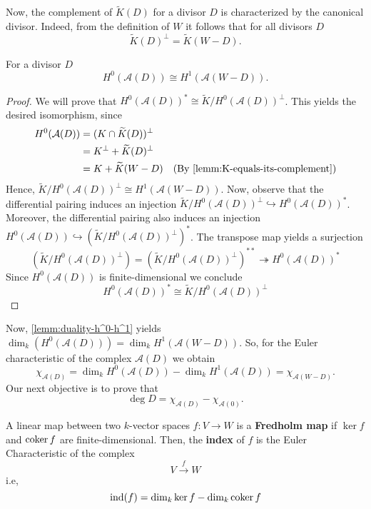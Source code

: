 Now, the complement of $\widetilde{K}(D)$ for a divisor $D$ is characterized by the canonical divisor. Indeed, from the definition of $W$ it follows that for all divisors $D$
\[
	\widetilde{K}(D)^{\perp} = \widetilde{K}(W - D).
\]
\begin{lemma}\label{lemm:duality-h^0-h^1}
	For a divisor $D$
	\[
		H^{0}(\mathcal{A}(D)) \cong H^{1}(\mathcal{A}(W - D)).
	\]
\end{lemma}
\begin{proof}
	We will prove that $H^{0}(\mathcal{A}(D))^{*}\cong \widetilde{K}/H^{0}(\mathcal{A}(D))^{\perp}$. This yields the desired isomorphism, since
	\begin{align*}
		H^{0}(\mathcal{A}(D)) &= (K\cap \widetilde{K}(D))^{\perp}\\
		&= K^{\perp} + \widetilde{K}(D)^{\perp} \\
		&= K + \widetilde{K}(W - D) \quad (\text{By }\cref{lemm:K-equals-its-complement})
	\end{align*}
	Hence, $\widetilde{K}/H^{0}(\mathcal{A}(D))^{\perp} \cong H^{1}(\mathcal{A}(W - D))$. Now, observe that the differential pairing induces an injection $\widetilde{K}/H^{0}(\mathcal{A}(D))^{\perp} \hookrightarrow H^{0}(\mathcal{A}(D))^{*}$. Moreover, the differential pairing also induces an injection $H^{0}(\mathcal{A}(D)) \hookrightarrow (\widetilde{K}/H^{0}(\mathcal{A}(D))^{\perp})^{*}$. The transpose map yields a surjection
	\[
		(\widetilde{K}/H^{0}(\mathcal{A}(D))^{\perp}) = (\widetilde{K}/H^{0}(\mathcal{A}(D))^{\perp})^{**} \twoheadrightarrow H^{0}(\mathcal{A}(D))^{*}
	\]
	Since $H^{0}(\mathcal{A}(D))$ is finite-dimensional we conclude 
	\[
		H^{0}(\mathcal{A}(D))^{*}\cong \widetilde{K}/H^{0}(\mathcal{A}(D))^{\perp}
	\]	
\end{proof}
Now, \cref{lemm:duality-h^0-h^1} yields $\dim_{k}(H^{0}(\mathcal{A}(D))) = \dim_{k}H^{1}(\mathcal{A}(W - D))$. So, for the Euler characteristic of the complex $\mathcal{A}(D)$ we obtain
\[
	\chi_{\mathcal{A}(D)} = \dim_{k}H^{0}(\mathcal{A}(D)) - \dim_{k}H^{1}(\mathcal{A}(D)) = \chi_{\mathcal{A}(W - D)}.
\]
Our next objective is to prove that
\[
	\deg D =  \chi_{\mathcal{A}(D)} - \chi_{\mathcal{A}(0)}.
\]
\begin{definition}\label{def:fredholm-map}
	A linear map between two $k$-vector spaces $f\colon V \to W$ is a \textbf{Fredholm map} if $\ker f$ and $\operatorname{coker} f$ are finite-dimensional. Then, the \textbf{index} of $f$ is the Euler Characteristic of the complex
	\[
		V \xrightarrow{f} W
	\]
	i.e,
	\[
		\operatorname{ind}(f) = \dim_{k}\ker f - \dim_{k}\operatorname{coker} f
	\]
\end{definition}
